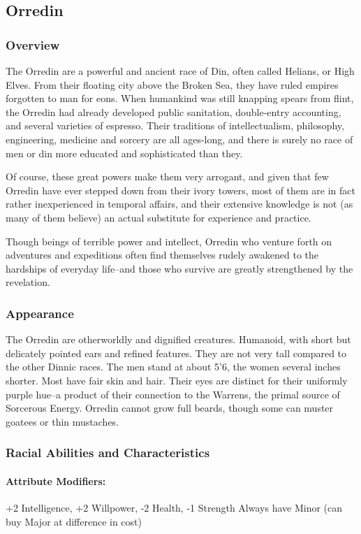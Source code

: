 \documentclass[oneside,11pt,english]{book}
\begin{document}
\subsection{Orredin}\label{sec:orredin}
\subsubsection*{Overview} 
The Orredin are a powerful and ancient race of Din, often called Helians, or High Elves. From their 
floating city above the Broken Sea, they have ruled empires forgotten to man for eons. When humankind 
was still knapping spears from flint, the Orredin had already developed public sanitation, double-entry 
accounting, and several varieties of espresso. Their traditions of intellectualism, philosophy, engineering, 
medicine and sorcery are all ages-long, and there is surely no race of men or din more educated and sophisticated than they. 

Of course, these great powers make them very arrogant, and given that few Orredin have ever stepped 
down from their ivory towers, most of them are in fact rather inexperienced in temporal affairs, and their 
extensive knowledge is not (as many of them believe) an actual substitute for experience and practice. 

Though beings of terrible power and intellect, Orredin who venture forth on adventures and expeditions 
often find themselves rudely awakened to the hardships of everyday life--and those who survive are 
greatly strengthened by the revelation. 
\subsubsection*{Appearance} 
The Orredin are otherworldly and dignified creatures. Humanoid, with short but delicately pointed ears 
and refined features. They are not very tall compared to the other Dinnic races. The men stand at about 
5’6, the women several inches shorter. Most have fair skin and hair. Their eyes are distinct for their 
uniformly purple hue--a product of their connection to the Warrens, the primal source of Sorcerous 
Energy. Orredin cannot grow full beards, though some can muster goatees or thin mustaches. 
\subsubsection*{Racial Abilities and Characteristics} 
\paragraph{Attribute Modifiers:} +2 Intelligence, +2 Willpower, -2 Health, -1 Strength 
Always have  Minor (can buy  Major at difference in cost)
\end{document}
